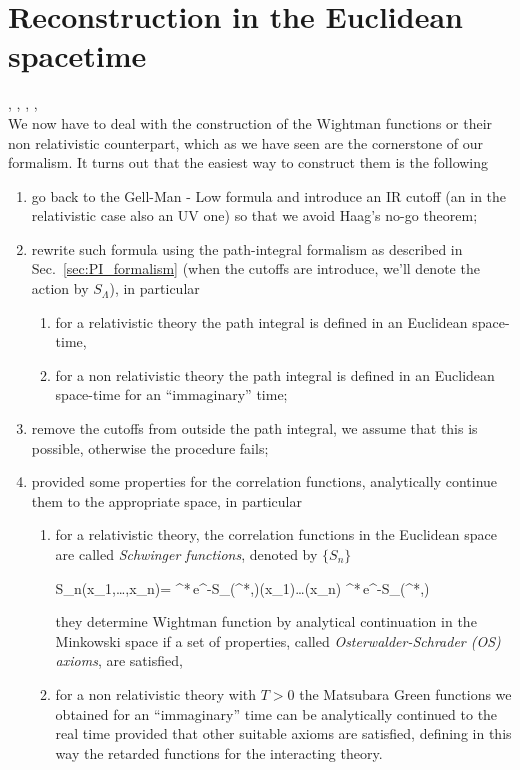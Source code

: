 \documentclass[../main/main.tex]{subfiles}
\begin{document}
\chapter{Reconstruction in the Euclidean spacetime}

\cite[Pages 185-191]{Streater:2000}, \cite{Summers:2016}, \cite{Wightman:1976}, \cite[Section 5.1]{Strocchi_2013}, \cite[Section 6.1, Chapter 19]{Glimm:1987}\\

We now have to deal with the construction of the Wightman functions or their non relativistic counterpart, which as we have seen are the cornerstone of our formalism. It turns out that the easiest way to construct them is the following
\begin{enumerate}[label=(\arabic*)]
	\item go back to the Gell-Man - Low formula and introduce an IR cutoff (an in the relativistic case also an UV one) so that we avoid Haag's no-go theorem;
	\item rewrite such formula using the path-integral formalism as described in Sec.~\ref{sec:PI_formalism} (when the cutoffs are introduce, we'll denote the action by $S_\Lambda$), in particular
	\begin{enumerate}[label=(\alph*)]
		\item for a relativistic theory the path integral is defined in an Euclidean space-time,
		\item for a non relativistic theory the path integral is defined in an Euclidean space-time for an ``immaginary'' time;
	\end{enumerate}
	\item remove the cutoffs from outside the path integral, we assume that this is possible, otherwise the procedure fails;
	\item provided some properties for the correlation functions, analytically continue them to the appropriate space, in particular
	\begin{enumerate}[label=(\alph*)]
		\item for a relativistic theory, the correlation functions in the Euclidean space are called \emph{Schwinger functions}, denoted by $\{S_n\}$
		\begin{eq}
			S_n(x_1,\ldots,x_n)=\limcutrem \frac%
			{\int\pide\phi\pide\phi^*\,e^{-S_\Lambda(\phi^*,\phi)}\phi(x_1)\ldots\phi(x_n)}
			{\int\pide\phi\pide\phi^*\,e^{-S_\Lambda(\phi^*,\phi)}}
		\end{eq}
		they determine Wightman function by analytical continuation in the Minkowski space if a set of properties, called \emph{Osterwalder-Schrader (OS) axioms}, are satisfied,
		\item for a non relativistic theory with $T>0$ the Matsubara Green functions we obtained for an ``immaginary'' time can be analytically continued to the real time provided that other suitable axioms are satisfied, defining in this way the retarded functions for the interacting theory.
	\end{enumerate}
\end{enumerate}
\end{document}
